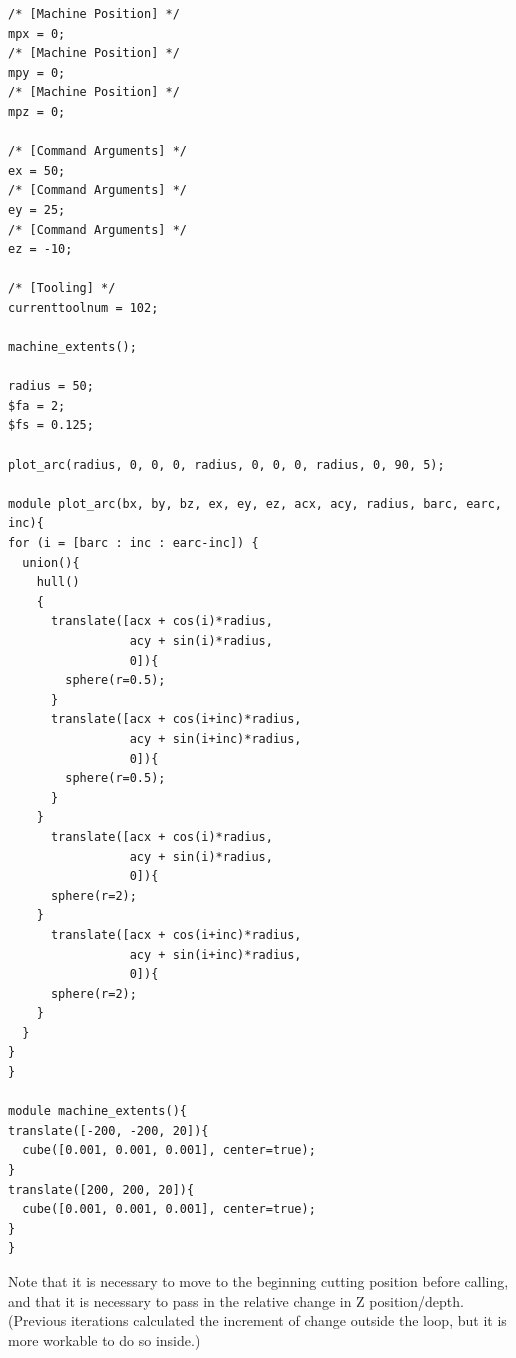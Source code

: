 \documentclass{ltxdoc}
\begin{document}
\begin{verbatim}
/* [Machine Position] */
mpx = 0;
/* [Machine Position] */
mpy = 0;
/* [Machine Position] */
mpz = 0;

/* [Command Arguments] */
ex = 50;
/* [Command Arguments] */
ey = 25;
/* [Command Arguments] */
ez = -10;

/* [Tooling] */
currenttoolnum = 102;

machine_extents();

radius = 50;
$fa = 2;
$fs = 0.125;

plot_arc(radius, 0, 0, 0, radius, 0, 0, 0, radius, 0, 90, 5);

module plot_arc(bx, by, bz, ex, ey, ez, acx, acy, radius, barc, earc, inc){
for (i = [barc : inc : earc-inc]) {
  union(){
    hull()
    {
      translate([acx + cos(i)*radius, 
                 acy + sin(i)*radius, 
                 0]){
        sphere(r=0.5);
      }
      translate([acx + cos(i+inc)*radius, 
                 acy + sin(i+inc)*radius, 
                 0]){
        sphere(r=0.5);
      }
    }
      translate([acx + cos(i)*radius, 
                 acy + sin(i)*radius, 
                 0]){
      sphere(r=2);
    }
      translate([acx + cos(i+inc)*radius, 
                 acy + sin(i+inc)*radius, 
                 0]){
      sphere(r=2);
    }
  }
}
}

module machine_extents(){
translate([-200, -200, 20]){
  cube([0.001, 0.001, 0.001], center=true);
}
translate([200, 200, 20]){
  cube([0.001, 0.001, 0.001], center=true);
}
}

\end{verbatim}


Note that it is necessary to move to the beginning cutting position before calling, and that it is necessary to pass in the relative change in Z position/depth. (Previous iterations calculated the increment of change outside the loop, but it is more workable to do so inside.)
\end{document}
